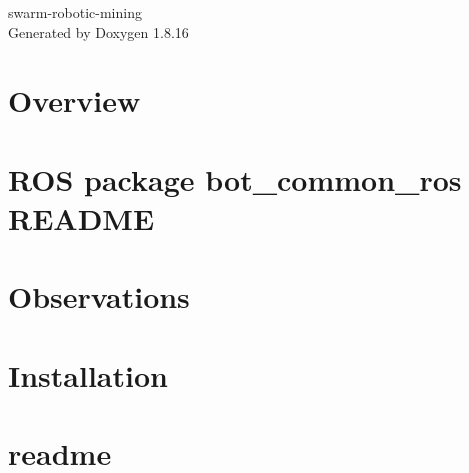 \let\mypdfximage\pdfximage\def\pdfximage{\immediate\mypdfximage}\documentclass[twoside]{book}
\newcommand{\+}{\discretionary{\mbox{\scriptsize$\hookleftarrow$}}{}{}}
\newcommand{\clearemptydoublepage}{%
  \newpage{\pagestyle{empty}\cleardoublepage}%
}
\begin{document}
\hypersetup{pageanchor=false,
             bookmarksnumbered=true,
             pdfencoding=unicode
            }
\begin{titlepage}
\vspace*{7cm}
\begin{center}%
{\Large swarm-\/robotic-\/mining }\\
\vspace*{1cm}
{\large Generated by Doxygen 1.8.16}\\
\end{center}
\end{titlepage}
\clearemptydoublepage
{}
\tableofcontents
\clearemptydoublepage
{}
\hypersetup{pageanchor=true}

\chapter{Overview}
\label{autotoc_md0}

\chapter{R\+OS package bot\+\_\+common\+\_\+ros R\+E\+A\+D\+ME}
\label{autotoc_md6}

\chapter{Observations}
\label{autotoc_md12}

\chapter{Installation}
\label{md__home_offworld5__off_world__code_swarm-robotic-mining_catkin_ws_src_bot_overseer_readme}

\chapter{readme}
\label{md__home_offworld5__off_world__code_swarm-robotic-mining_catkin_ws_src_bot_perception_ros_readme}

\end{document}

